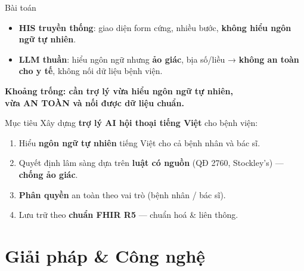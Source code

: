\documentclass[aspectratio=169,t]{beamer}
\begin{document}
\begin{frame}{Bài toán}
  \begin{itemize}
    \item \textbf{HIS truyền thống}: giao diện form cứng, nhiều bước, \textbf{không hiểu ngôn ngữ tự nhiên}.
    \item \textbf{LLM thuần}: hiểu ngôn ngữ nhưng \textbf{ảo giác}, bịa số/liều → \textbf{không an toàn cho y tế}, không nối dữ liệu bệnh viện.
  \end{itemize}
  \vspace{0.3cm}
  \begin{center}
    \color{hustprimary}\large\textbf{Khoảng trống: cần trợ lý vừa hiểu ngôn ngữ tự nhiên,\\ vừa AN TOÀN và nối được dữ liệu chuẩn.}
  \end{center}
\end{frame}

\begin{frame}{Mục tiêu}
  Xây dựng \textbf{trợ lý AI hội thoại tiếng Việt} cho bệnh viện:
  \begin{enumerate}
    \item Hiểu \textbf{ngôn ngữ tự nhiên} tiếng Việt cho cả bệnh nhân và bác sĩ.
    \item Quyết định lâm sàng dựa trên \textbf{luật có nguồn} (QĐ 2760, Stockley's) — \textbf{chống ảo giác}.
    \item \textbf{Phân quyền} an toàn theo vai trò (bệnh nhân / bác sĩ).
    \item Lưu trữ theo \textbf{chuẩn FHIR R5} — chuẩn hoá \& liên thông.
  \end{enumerate}
\end{frame}

\section{Giải pháp \& Công nghệ}
\end{document}
